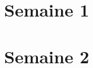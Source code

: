 \documentclass[11pt]{article}
\begin{document}
\tableofcontents
\section{Semaine 1}
\lipsum[1-5]
\section{Semaine 2}
\lipsum[6-10]
\end{document}
